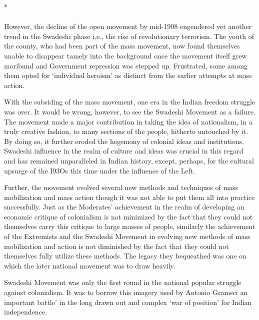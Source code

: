 \begin{center}*\end{center}

\paragraph*{}


However, the decline of the open movement by mid-1908 engendered yet another trend in the Swadeshi phase i.e., the rise of revolutionary terrorism. The youth of the county, who had been part of the mass movement, now found themselves unable to disappear tamely into the background once the movement itself grew moribund and Government repression was stepped up. Frustrated, some among them opted for `individual heroism' as distinct from the earlier attempts at mass action.

With the subsiding of the mass movement, one era in the Indian freedom struggle was over. It would be wrong, however, to see the Swadeshi Movement as a failure. The movement made a major contribution in taking the idea of nationalism, in a truly creative fashion, to many sections of the people, hitherto untouched by it. By doing so, it further eroded the hegemony of colonial ideas and institutions. Swadeshi influence in the realm of culture and ideas was crucial in this regard and has remained unparalleled in Indian history, except, perhaps, for the cultural upsurge of the I93Os this time under the influence of the Left.

Further, the movement evolved several new methods and techniques of mass mobilization and mass action though it was not able to put them all into practice successfully. Just as the Moderates' achievement in the realm of developing an economic critique of colonialism is not minimized by the fact that they could not themselves carry this critique to large masses of people, similarly the achievement of the Extremists and the Swadeshi Movement in evolving new methods of mass mobilization and action is not diminished by the fact that they could not themselves fully utilize these methods. The legacy they bequeathed was one on which the later national movement was to draw heavily.

Swadeshi Movement was only the first round in the national popular struggle against colonialism. It was to borrow this imagery used by Antonio Gramsci an important battle' in the long drawn out and complex `war of position' for Indian independence.
